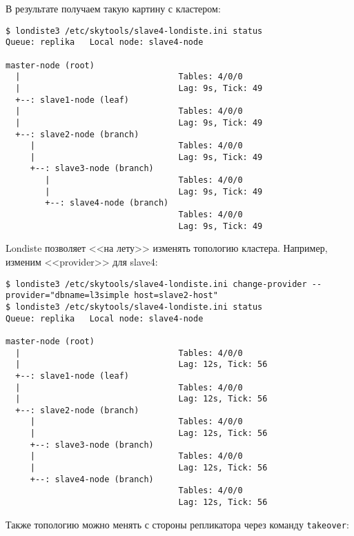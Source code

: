В результате получаем такую картину с кластером:

\begin{lstlisting}[label=lst:londiste-cascade6,caption=Кластер с каскадной репликацией]
$ londiste3 /etc/skytools/slave4-londiste.ini status
Queue: replika   Local node: slave4-node

master-node (root)
  |                                Tables: 4/0/0
  |                                Lag: 9s, Tick: 49
  +--: slave1-node (leaf)
  |                                Tables: 4/0/0
  |                                Lag: 9s, Tick: 49
  +--: slave2-node (branch)
     |                             Tables: 4/0/0
     |                             Lag: 9s, Tick: 49
     +--: slave3-node (branch)
        |                          Tables: 4/0/0
        |                          Lag: 9s, Tick: 49
        +--: slave4-node (branch)
                                   Tables: 4/0/0
                                   Lag: 9s, Tick: 49
\end{lstlisting}

Londiste позволяет <<на лету>> изменять топологию кластера. Например, изменим <<provider>> для slave4:

\begin{lstlisting}[label=lst:londiste-cascade7,caption=Изменяем топологию]
$ londiste3 /etc/skytools/slave4-londiste.ini change-provider --provider="dbname=l3simple host=slave2-host"
$ londiste3 /etc/skytools/slave4-londiste.ini status
Queue: replika   Local node: slave4-node

master-node (root)
  |                                Tables: 4/0/0
  |                                Lag: 12s, Tick: 56
  +--: slave1-node (leaf)
  |                                Tables: 4/0/0
  |                                Lag: 12s, Tick: 56
  +--: slave2-node (branch)
     |                             Tables: 4/0/0
     |                             Lag: 12s, Tick: 56
     +--: slave3-node (branch)
     |                             Tables: 4/0/0
     |                             Lag: 12s, Tick: 56
     +--: slave4-node (branch)
                                   Tables: 4/0/0
                                   Lag: 12s, Tick: 56
\end{lstlisting}

Также топологию можно менять с стороны репликатора через команду \lstinline!takeover!:

